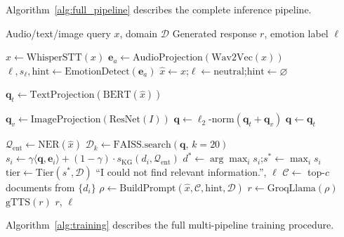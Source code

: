 \documentclass[10pt,conference]{IEEEtran}
\theoremstyle{ieeethm}
\theoremstyle{ieeedef}
\theoremstyle{ieeeremark}
\begin{document}
Algorithm~\ref{alg:full_pipeline} describes the complete inference pipeline.

\begin{algorithm}[!t]
\caption{MIVA-KNIGHT Inference}
\label{alg:full_pipeline}
\begin{algorithmic}[1]
\Require Audio/text/image query $x$, domain $\mathcal{D}$
\Ensure Generated response $r$, emotion label $\ell$

  \State $\hat{x} \gets \text{WhisperSTT}(x)$  
  \State $\mathbf{e}_a \gets \text{AudioProjection}(\text{Wav2Vec}(x))$
  \State $\ell, s_\ell, \text{hint} \gets \text{EmotionDetect}(\mathbf{e}_a)$  
\Else
  \State $\hat{x} \gets x$;\quad $\ell \gets \text{neutral}$;\quad $\text{hint} \gets \varnothing$
\EndIf

\State $\mathbf{q}_t \gets \text{TextProjection}(\text{BERT}(\hat{x}))$  

  \State $\mathbf{q}_v \gets \text{ImageProjection}(\text{ResNet}(I))$
  \State $\mathbf{q} \gets \ell_2\text{-norm}(\mathbf{q}_t + \mathbf{q}_v)$
\Else
  \State $\mathbf{q} \gets \mathbf{q}_t$
\EndIf

\State $\mathcal{Q}_\text{ent} \gets \text{NER}(\hat{x})$  
\State $\mathcal{D}_k \gets \text{FAISS.search}(\mathbf{q},\, k{=}20)$  
  \State $s_i \gets \gamma\langle\mathbf{q},\mathbf{e}_i\rangle + (1{-}\gamma)\cdot s_\text{KG}(d_i, \mathcal{Q}_\text{ent})$
\EndFor
\State $d^* \gets \arg\max_i s_i$;\quad $s^* \gets \max_i s_i$
\State $\text{tier} \gets \text{Tier}(s^*,\mathcal{D})$  
  \State \Return ``I could not find relevant information.'', $\ell$
\EndIf
\State $\mathcal{C} \gets$ top-$c$ documents from $\{d_i\}$  
\State $\rho \gets \text{BuildPrompt}(\hat{x}, \mathcal{C}, \text{hint}, \mathcal{D})$
\State $r \gets \text{GroqLlama}(\rho)$  
\State $\text{gTTS}(r)$  
\State \Return $r$, $\ell$
\end{algorithmic}
\end{algorithm}

Algorithm~\ref{alg:training} describes the full multi-pipeline training procedure.
\end{document}
